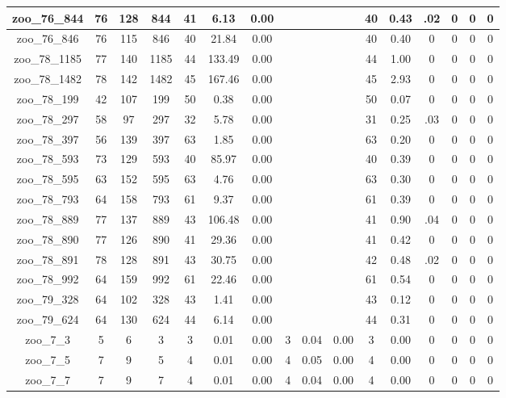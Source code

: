 \begin{landscape}
\begin{longtable}{|c|c|c|c|c|c|c|c|c|c|c|c|c|c|c|c|}
zoo\_76\_844 & 76 & 128 & 844 & 41 & 6.13 & 0.00 &  &  &  & 40 & 0.43 & .02 & 0 & 0 & 0 \\ \hline 
zoo\_76\_846 & 76 & 115 & 846 & 40 & 21.84 & 0.00 &  &  &  & 40 & 0.40 & 0 & 0 & 0 & 0 \\ \hline 
zoo\_78\_1185 & 77 & 140 & 1185 & 44 & 133.49 & 0.00 &  &  &  & 44 & 1.00 & 0 & 0 & 0 & 0 \\ \hline 
zoo\_78\_1482 & 78 & 142 & 1482 & 45 & 167.46 & 0.00 &  &  &  & 45 & 2.93 & 0 & 0 & 0 & 0 \\ \hline 
zoo\_78\_199 & 42 & 107 & 199 & 50 & 0.38 & 0.00 &  &  &  & 50 & 0.07 & 0 & 0 & 0 & 0 \\ \hline 
zoo\_78\_297 & 58 & 97 & 297 & 32 & 5.78 & 0.00 &  &  &  & 31 & 0.25 & .03 & 0 & 0 & 0 \\ \hline 
zoo\_78\_397 & 56 & 139 & 397 & 63 & 1.85 & 0.00 &  &  &  & 63 & 0.20 & 0 & 0 & 0 & 0 \\ \hline 
zoo\_78\_593 & 73 & 129 & 593 & 40 & 85.97 & 0.00 &  &  &  & 40 & 0.39 & 0 & 0 & 0 & 0 \\ \hline 
zoo\_78\_595 & 63 & 152 & 595 & 63 & 4.76 & 0.00 &  &  &  & 63 & 0.30 & 0 & 0 & 0 & 0 \\ \hline 
zoo\_78\_793 & 64 & 158 & 793 & 61 & 9.37 & 0.00 &  &  &  & 61 & 0.39 & 0 & 0 & 0 & 0 \\ \hline 
zoo\_78\_889 & 77 & 137 & 889 & 43 & 106.48 & 0.00 &  &  &  & 41 & 0.90 & .04 & 0 & 0 & 0 \\ \hline 
zoo\_78\_890 & 77 & 126 & 890 & 41 & 29.36 & 0.00 &  &  &  & 41 & 0.42 & 0 & 0 & 0 & 0 \\ \hline 
zoo\_78\_891 & 78 & 128 & 891 & 43 & 30.75 & 0.00 &  &  &  & 42 & 0.48 & .02 & 0 & 0 & 0 \\ \hline 
zoo\_78\_992 & 64 & 159 & 992 & 61 & 22.46 & 0.00 &  &  &  & 61 & 0.54 & 0 & 0 & 0 & 0 \\ \hline 
zoo\_79\_328 & 64 & 102 & 328 & 43 & 1.41 & 0.00 &  &  &  & 43 & 0.12 & 0 & 0 & 0 & 0 \\ \hline 
zoo\_79\_624 & 64 & 130 & 624 & 44 & 6.14 & 0.00 &  &  &  & 44 & 0.31 & 0 & 0 & 0 & 0 \\ \hline 
zoo\_7\_3 & 5 & 6 & 3 & 3 & 0.01 & 0.00 & 3 & 0.04 & 0.00 & 3 & 0.00 & 0 & 0 & 0 & 0 \\ \hline 
zoo\_7\_5 & 7 & 9 & 5 & 4 & 0.01 & 0.00 & 4 & 0.05 & 0.00 & 4 & 0.00 & 0 & 0 & 0 & 0 \\ \hline 
zoo\_7\_7 & 7 & 9 & 7 & 4 & 0.01 & 0.00 & 4 & 0.04 & 0.00 & 4 & 0.00 & 0 & 0 & 0 & 0 \\ \hline 

\end{longtable}
\end{landscape}
